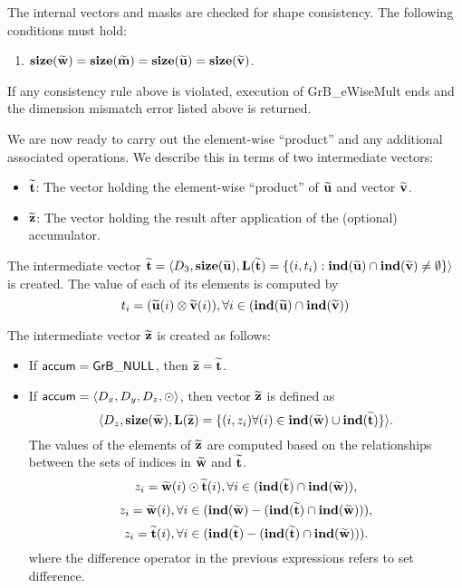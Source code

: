 The internal vectors and masks are checked for shape consistency. The following 
conditions must hold:
\begin{enumerate}
	\item $\bold{size}({\bf \widetilde{w}}) = \bold{size}({\bf \widetilde{m}})
    = \bold{size}({\bf \widetilde{u}}) = \bold{size}({\bf \widetilde{v}})$.
\end{enumerate}
If any consistency rule above is violated, execution of {\sf GrB\_eWiseMult} ends and 
the dimension mismatch error listed above is returned.

We are now ready to carry out the element-wise ``product'' and any additional 
associated operations.  We describe this in terms of two intermediate vectors:
\begin{itemize}
	\item ${\bf \widetilde{t}}$: The vector holding the element-wise ``product'' of
    ${\bf \widetilde{u}}$ and vector ${\bf \widetilde{v}}$.
	\item ${\bf \widetilde{z}}$: The vector holding the result after 
    application of the (optional) accumulator.
\end{itemize}

The intermediate vector ${\bf \widetilde{t}} = \langle
D_3, \bold{size}({\bf \widetilde{u}}),
\bold{L}({\bf \widetilde{t}}) =
\{(i,t_i) : \bold{ind}({\bf \widetilde{u}}) \cap 
\bold{ind}({\bf \widetilde{v}})
 \neq \emptyset \} \rangle$
is created.  The value of each of its elements is computed by 
\[t_i = ({\bf \widetilde{u}}(i)
\otimes {\bf \widetilde{v}}(i)), \forall i \in 
(\bold{ind}({\bf \widetilde{u}}) \cap 
\bold{ind}({\bf \widetilde{v}}))\]

The intermediate vector ${\bf \widetilde{z}}$ is created as follows:
\begin{itemize}
    \item If ${\sf accum} = {\sf GrB\_NULL}$, then ${\bf \widetilde{z}} = {\bf \widetilde{t}}$.

    \item If ${\sf accum} = \langle D_x, D_y, D_z, \odot \rangle$, then vector ${\bf \widetilde{z}}$ is defined as 
        \[ \langle D_z, \bold{size}({\bf \widetilde{w}}), \bold{L}({\bf \widetilde{z}})
		= \{(i,z_{i})  \forall (i) \in \bold{ind}({\bf \widetilde{w}}) \cup 
        \bold{ind}({\bf \widetilde{t}}) \} \rangle.\]
    The values of the elements of ${\bf \widetilde{z}}$ are computed based on the relationships between the sets of indices in ${\bf \widetilde{w}}$ and ${\bf \widetilde{t}}$.
\[
z_{i} = {\bf \widetilde{w}}(i) \odot {\bf \widetilde{t}}(i), \forall i \in  (\bold{ind}({\bf \widetilde{t}}) \cap \bold{ind}({\bf \widetilde{w}})),
\]
\[
z_{i} = {\bf \widetilde{w}}(i), \forall  i \in  (\bold{ind}({\bf \widetilde{w}}) - (\bold{ind}({\bf \widetilde{t}}) \cap \bold{ind}({\bf \widetilde{w}}))),
\]
\[
z_{i} = {\bf \widetilde{t}}(i), \forall  i \in  (\bold{ind}({\bf \widetilde{t}}) - (\bold{ind}({\bf \widetilde{t}}) \cap \bold{ind}({\bf \widetilde{w}}))).
\]
where the difference operator in the previous expressions refers to set difference.
\end{itemize}

